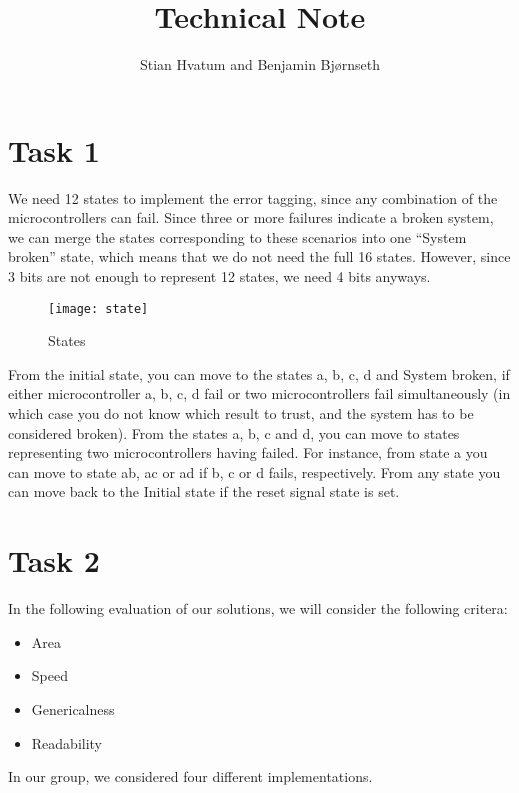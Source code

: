 \documentclass[11pt]{article}
\title{Technical Note}
\author{Stian Hvatum and Benjamin Bjørnseth}
\begin{document}
\maketitle
\tableofcontents
\newpage
\section{Task 1}
\label{sec:task1}
We need 12 states to implement the error tagging, since any
combination of the microcontrollers can fail. Since three or more
failures indicate a broken system, we can merge the states
corresponding to these scenarios into one ``System broken'' state,
which means that we do not need the full 16 states. However, since 3
bits are not enough to represent 12 states, we need 4 bits anyways.

\begin{figure}
    \begin{center}
\texttt{[image: state]}
    \end{center}
\caption{States}
\label{fig:states}
\end{figure}

From the initial state, you can move to the states a, b, c, d and
System broken, if either microcontroller a, b, c, d fail or two
microcontrollers fail simultaneously (in which case you do not know
which result to trust, and the system has to be considered
broken). From the states a, b, c and d, you can move to states
representing two microcontrollers having failed. For instance, from
state a you can move to state ab, ac or ad if b, c or d fails,
respectively. From any state you can move back to the Initial state if
the reset signal state is set.

\section{Task 2}
\label{sec:task2}

In the following evaluation of our solutions, we will consider the
following critera:
\begin{itemize}

\item Area
\item Speed
\item Genericalness
\item Readability

\end{itemize}

In our group, we considered four different implementations. 
\end{document}

